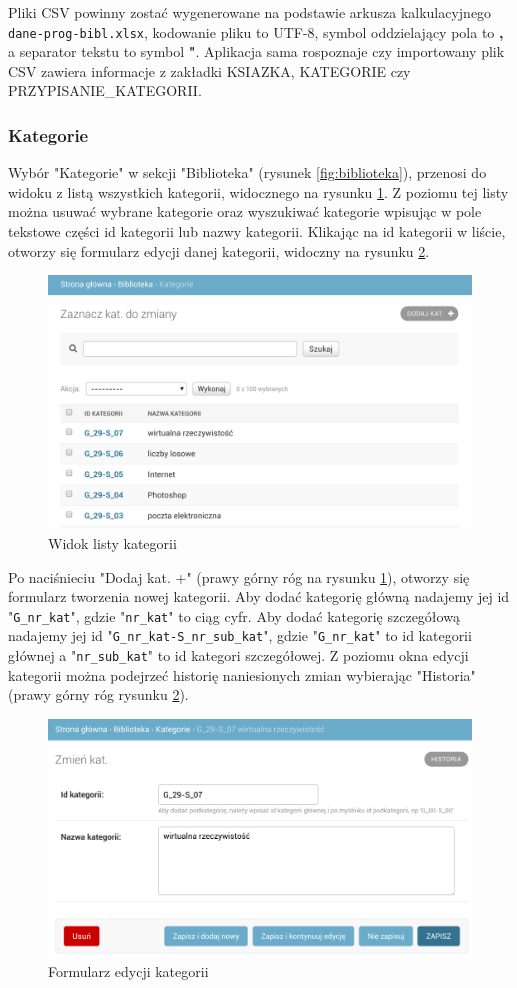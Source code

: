 \documentclass[twoside]{projektInzynierskiMS}
\begin{document}
Pliki CSV powinny zostać wygenerowane na podstawie arkusza kalkulacyjnego \verb`dane-prog-bibl.xlsx`, kodowanie pliku to UTF-8, symbol oddzielający pola to \textbf{,} a separator tekstu to symbol \textbf{"}. Aplikacja sama rospoznaje czy importowany plik CSV zawiera informacje z zakładki KSIAZKA, KATEGORIE czy PRZYPISANIE\_KATEGORII.

\subsubsection{Kategorie}

Wybór "Kategorie" w sekcji "Biblioteka" (rysunek \ref{fig:biblioteka}), przenosi do widoku z listą wszystkich kategorii, widocznego na rysunku \ref{fig:adminAllCategories}. Z poziomu tej listy można usuwać wybrane kategorie oraz wyszukiwać kategorie wpisując w pole tekstowe części id kategorii lub nazwy kategorii. Klikając na id kategorii w liście, otworzy się formularz edycji danej kategorii, widoczny na rysunku \ref{fig:adminEditCategory}. 

\begin{figure}[h]
  \centering
  \includegraphics[width=0.4\linewidth]{img/ListaKategorii.png}
  \caption{Widok listy kategorii}
  \label{fig:adminAllCategories}
\end{figure}

Po naciśnieciu "Dodaj kat. +" (prawy górny róg na rysunku \ref{fig:adminAllCategories}), otworzy się formularz tworzenia nowej kategorii. Aby dodać kategorię główną nadajemy jej id "\verb`G_nr_kat`", gdzie "\verb`nr_kat`" to ciąg cyfr. Aby dodać kategorię szczegółową nadajemy jej id "\verb`G_nr_kat-S_nr_sub_kat`", gdzie "\verb`G_nr_kat`" to id kategorii głównej a "\verb`nr_sub_kat`" to id kategori szczegółowej.
Z poziomu okna edycji kategorii można podejrzeć historię naniesionych zmian wybierając "Historia" (prawy górny róg rysunku \ref{fig:adminEditCategory}).



\begin{figure}[h]
  \centering
  \includegraphics[width=0.4\linewidth]{img/EdycjaKategorii.png}
  \caption{Formularz edycji kategorii}
  \label{fig:adminEditCategory}
\end{figure}
\end{document}
